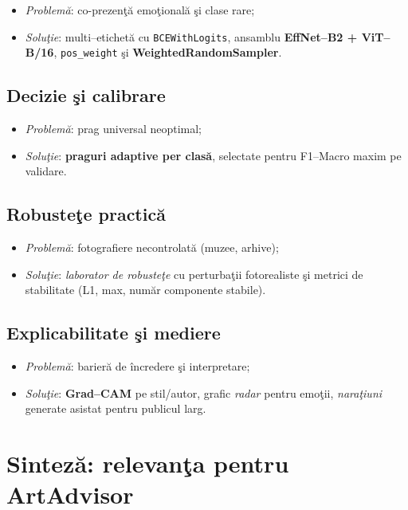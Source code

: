 \begin{itemize}[leftmargin=*, itemsep=2pt, topsep=2pt]
  \item \emph{Problemă}: co-prezenţă emoţională şi clase rare;
  \item \emph{Soluţie}: multi–etichetă cu \texttt{BCEWithLogits}, ansamblu \textbf{EffNet–B2 + ViT–B/16}, \texttt{pos\_weight} şi \textbf{WeightedRandomSampler}.
\end{itemize}

\subsection{Decizie şi calibrare}

\begin{itemize}[leftmargin=*, itemsep=2pt, topsep=2pt]
  \item \emph{Problemă}: prag universal neoptimal;
  \item \emph{Soluţie}: \textbf{praguri adaptive per clasă}, selectate pentru F1–Macro maxim pe validare.
\end{itemize}

\subsection{Robusteţe practică}

\begin{itemize}[leftmargin=*, itemsep=2pt, topsep=2pt]
  \item \emph{Problemă}: fotografiere necontrolată (muzee, arhive);
  \item \emph{Soluţie}: \emph{laborator de robusteţe} cu perturbaţii fotorealiste şi metrici de stabilitate (L1, max, număr componente stabile).
\end{itemize}

\subsection{Explicabilitate şi mediere}

\begin{itemize}[leftmargin=*, itemsep=2pt, topsep=2pt]
  \item \emph{Problemă}: barieră de încredere şi interpretare;
  \item \emph{Soluţie}: \textbf{Grad–CAM} pe stil/autor, grafic \emph{radar} pentru emoţii, \emph{naraţiuni} generate asistat pentru publicul larg.
\end{itemize}

\section{Sinteză: relevanţa pentru ArtAdvisor}

